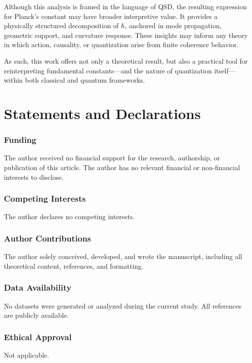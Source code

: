 \documentclass[ht-mathphys]{ht-fmt}
\theoremstyle{thmstyleone}%
\theoremstyle{thmstyletwo}%
\theoremstyle{thmstylethree}%
\begin{document}
Although this analysis is framed in the language of QSD, the resulting expression for Planck’s constant may have broader interpretive value. It provides a physically structured decomposition of \( \hbar \), anchored in mode propagation, geometric support, and curvature response. These insights may inform any theory in which action, causality, or quantization arise from finite coherence behavior.

As such, this work offers not only a theoretical result, but also a practical tool for reinterpreting fundamental constants—and the nature of quantization itself—within both classical and quantum frameworks.



\pagebreak
\section*{Statements and Declarations}
\subsubsection{Funding}  
The author received no financial support for the research, authorship, or publication of this article.
The author has no relevant financial or non-financial interests to disclose.

\subsubsection{Competing Interests}  
The author declares no competing interests.

\subsubsection{Author Contributions}  
The author solely conceived, developed, and wrote the manuscript, including all theoretical content, references, and formatting.

\subsubsection{Data Availability}  
No datasets were generated or analyzed during the current study. All references are publicly available.

\subsubsection{Ethical Approval}  
Not applicable.
\end{document}
